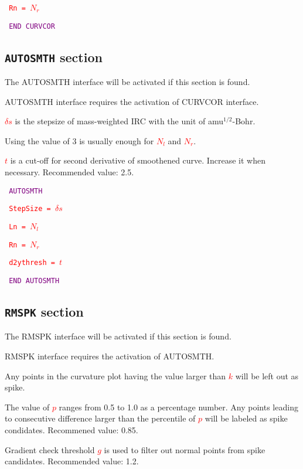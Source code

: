 \texttt{
\textcolor{red}{Rn = $N_r$}}


\texttt{
\textcolor{Purple}{END CURVCOR}}



\subsection{\texttt{AUTOSMTH} section }
The AUTOSMTH interface will be activated if this section is found.

AUTOSMTH interface requires the activation of CURVCOR interface.

\texttt{\textcolor{red}{$\delta s$}} is the stepsize of mass-weighted IRC with the unit of amu$^{1/2}$-Bohr.

Using the value of 3 is usually enough for 
\texttt{\textcolor{red}{$N_l$}} and \texttt{\textcolor{red}{$N_r$}}.

\texttt{\textcolor{red}{$t$}} is a cut-off for second derivative of smoothened curve. Increase it when necessary. Recommended value: 2.5.



\texttt{
\textcolor{Purple}{AUTOSMTH}}

\texttt{
\textcolor{red}{StepSize = $\delta s$}}

\texttt{
\textcolor{red}{Ln = $N_l$}}

\texttt{
\textcolor{red}{Rn = $N_r$}}

\texttt{
\textcolor{red}{d2ythresh = $t$}}


\texttt{
\textcolor{Purple}{END AUTOSMTH}}


\subsection{\texttt{RMSPK} section }
The RMSPK interface will be activated if this section is found.

RMSPK interface requires the activation of AUTOSMTH.

Any points in the curvature plot having the value larger than \texttt{\textcolor{red}{$k$}} will be left out as spike.

The value of \texttt{\textcolor{red}{$p$}} ranges from 0.5 to 1.0 as a percentage number. Any points leading to consecutive difference larger than the percentile of \texttt{\textcolor{red}{$p$}} will be labeled as spike condidates. Recommened value: 0.85.

Gradient check threshold \texttt{\textcolor{red}{$g$}} is used to filter out normal points from spike candidates. Recommended value: 1.2.



